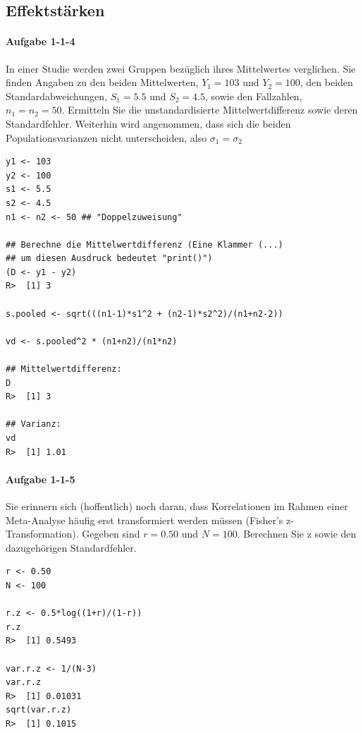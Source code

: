 \documentclass[normalheadings, 10pt]{scrartcl}\usepackage{graphicx, color}
\makeatletter
\newenvironment{kframe}{%
 \def\at@end@of@kframe{}%
 \ifinner\ifhmode%
  \def\at@end@of@kframe{\end{minipage}}%
  \begin{minipage}{\columnwidth}%
 \fi\fi%
 \def\FrameCommand##1{\hskip\@totalleftmargin \hskip-\fboxsep
 \colorbox{shadecolor}{##1}\hskip-\fboxsep
     \hskip-\linewidth \hskip-\@totalleftmargin \hskip\columnwidth}%
 \MakeFramed {\advance\hsize-\width
   \@totalleftmargin\z@ \linewidth\hsize
   \@setminipage}}%
 {\par\unskip\endMakeFramed%
 \at@end@of@kframe}
\newenvironment{knitrout}{}{} %
\makeatother
\begin{document}
\subsection{Effektstärken}

\paragraph{Aufgabe 1-1-4} In einer Studie werden zwei Gruppen bezüglich ihres Mittelwertes
  verglichen. Sie finden Angaben zu den beiden Mittelwerten, $Y_1 = 103$ und
  $Y_2=100$, den beiden Standardabweichungen, $S_1=5.5$ und $S_2=4.5$, sowie den
  Fallzahlen, $n_1=n_2=50$. Ermitteln Sie die unstandardisierte
  Mittelwertdifferenz sowie deren Standardfehler. Weiterhin wird angenommen,
  dass sich die beiden Populationsvarianzen nicht unterscheiden, also $\sigma_1=\sigma_2$

\begin{rbsp}
\begin{knitrout}
\color{fgcolor}\begin{kframe}
\begin{verbatim}
y1 <- 103
y2 <- 100
s1 <- 5.5
s2 <- 4.5
n1 <- n2 <- 50 ## "Doppelzuweisung"

## Berechne die Mittelwertdifferenz (Eine Klammer (...)
## um diesen Ausdruck bedeutet "print()")
(D <- y1 - y2)
R>  [1] 3

s.pooled <- sqrt(((n1-1)*s1^2 + (n2-1)*s2^2)/(n1+n2-2))

vd <- s.pooled^2 * (n1+n2)/(n1*n2)

## Mittelwertdifferenz:
D
R>  [1] 3

## Varianz:
vd
R>  [1] 1.01
\end{verbatim}
\end{kframe}
\end{knitrout}

\end{rbsp}


\paragraph{Aufgabe 1-1-5} Sie erinnern sich (hoffentlich) noch daran, dass Korrelationen im Rahmen
  einer Meta-Analyse häufig erst transformiert werden müssen (Fisher's
  z-Trans\-for\-ma\-tion). Gegeben sind $r=0.50$ und $N=100$. Berechnen Sie z sowie
  den dazugehörigen Standardfehler.

\begin{rbsp}
\begin{knitrout}
\color{fgcolor}\begin{kframe}
\begin{verbatim}
r <- 0.50
N <- 100

r.z <- 0.5*log((1+r)/(1-r))
r.z
R>  [1] 0.5493

var.r.z <- 1/(N-3)
var.r.z
R>  [1] 0.01031
sqrt(var.r.z)
R>  [1] 0.1015
\end{verbatim}
\end{kframe}
\end{knitrout}

\end{rbsp}
\end{document}

